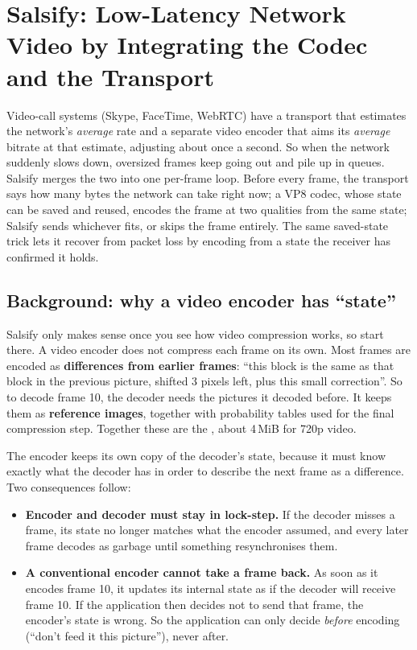 \chapter{Salsify: Low-Latency Network Video by Integrating the Codec and the Transport}

\begin{keybox}
Video-call systems (Skype, FaceTime, WebRTC) have a transport that estimates the network's \emph{average} rate and a separate video encoder that
aims its \emph{average} bitrate at that estimate, adjusting about once a second. So when the network suddenly slows down, oversized frames keep
going out and pile up in queues. Salsify merges the two into one per-frame loop. Before every frame, the transport says how many bytes the network
can take right now; a  VP8 codec, whose state can be saved and reused, encodes the frame at two qualities from the same state;
Salsify sends whichever fits, or skips the frame entirely. The same saved-state trick lets it recover from packet loss by encoding from a state the
receiver has confirmed it holds.
\end{keybox}

\section{Background: why a video encoder has ``state''}

Salsify only makes sense once you see how video compression works, so start there. A video encoder does not compress each frame on its own.
Most frames are encoded as \textbf{differences from earlier frames}: ``this block is the same as that block in the previous picture, shifted 3
pixels left, plus this small correction''. So to decode frame 10, the decoder needs the pictures it decoded before. It keeps them as
\textbf{reference images}, together with probability tables used for the final compression step. Together these are the , about
4\,MiB for 720p video.

The encoder keeps its own copy of the decoder's state, because it must know exactly what the decoder has in order to describe the next frame as a
difference. Two consequences follow:
\begin{itemize}
  \item \textbf{Encoder and decoder must stay in lock-step.} If the decoder misses a frame, its state no longer matches what the encoder assumed, and
        every later frame decodes as garbage until something resynchronises them.
  \item \textbf{A conventional encoder cannot take a frame back.} As soon as it encodes frame 10, it updates its internal state as if the decoder will
        receive frame 10. If the application then decides not to send that frame, the encoder's state is wrong. So the application can only decide
        \emph{before} encoding (``don't feed it this picture''), never after.
\end{itemize}

